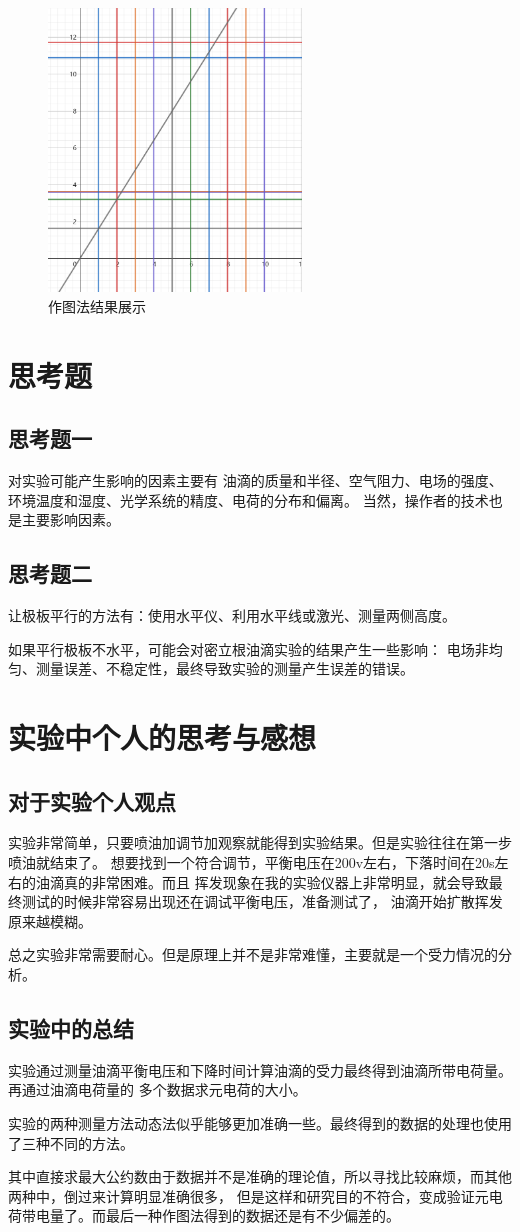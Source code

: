 \documentclass{ctexart}
\begin{document}
  \begin{figure}[H]
    \centering
    \includegraphics[height=0.5\textwidth,width=0.6\textwidth]{geotu.png}
    \caption{作图法结果展示}\label{geotu}
  \end{figure}

\section{思考题}
  \subsection{思考题一}
  对实验可能产生影响的因素主要有
  油滴的质量和半径、空气阻力、电场的强度、环境温度和湿度、光学系统的精度、电荷的分布和偏离。
  当然，操作者的技术也是主要影响因素。
  \subsection{思考题二}
  让极板平行的方法有：使用水平仪、利用水平线或激光、测量两侧高度。

  如果平行极板不水平，可能会对密立根油滴实验的结果产生一些影响：
  电场非均匀、测量误差、不稳定性，最终导致实验的测量产生误差的错误。

\section{实验中个人的思考与感想}
  \subsection{对于实验个人观点}
  实验非常简单，只要喷油加调节加观察就能得到实验结果。但是实验往往在第一步喷油就结束了。
  想要找到一个符合调节，平衡电压在200v左右，下落时间在20s左右的油滴真的非常困难。而且
  挥发现象在我的实验仪器上非常明显，就会导致最终测试的时候非常容易出现还在调试平衡电压，准备测试了，
  油滴开始扩散挥发原来越模糊。

  总之实验非常需要耐心。但是原理上并不是非常难懂，主要就是一个受力情况的分析。
  \subsection{实验中的总结}
  实验通过测量油滴平衡电压和下降时间计算油滴的受力最终得到油滴所带电荷量。再通过油滴电荷量的
  多个数据求元电荷的大小。

  实验的两种测量方法动态法似乎能够更加准确一些。最终得到的数据的处理也使用了三种不同的方法。
  
  其中直接求最大公约数由于数据并不是准确的理论值，所以寻找比较麻烦，而其他两种中，倒过来计算明显准确很多，
  但是这样和研究目的不符合，变成验证元电荷带电量了。而最后一种作图法得到的数据还是有不少偏差的。
\end{document}
